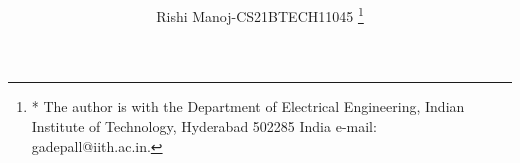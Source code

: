 \documentclass[journal,12pt,twocolumn]{IEEEtran}
\renewcommand\thesection{\arabic{section}}
\begin{document}
\makeatletter
{}
\makeatother
\let\StandardTheFigure\thefigure
\renewcommand{\thefigure}{\thesection}
\makeatletter
{}
\makeatother
\let\StandardTheFigure\thefigure
\let\StandardTheTable\thetable
\let\vec\mathbf
{}
\vspace{3cm}
\title{%
}
%
%
%
\author{ Rishi Manoj-CS21BTECH11045%
\thanks{* The author is with the Department
of Electrical Engineering, Indian Institute of Technology, Hyderabad
502285 India e-mail:  gadepall@iith.ac.in.}%
}
% 
%
\end{document}
